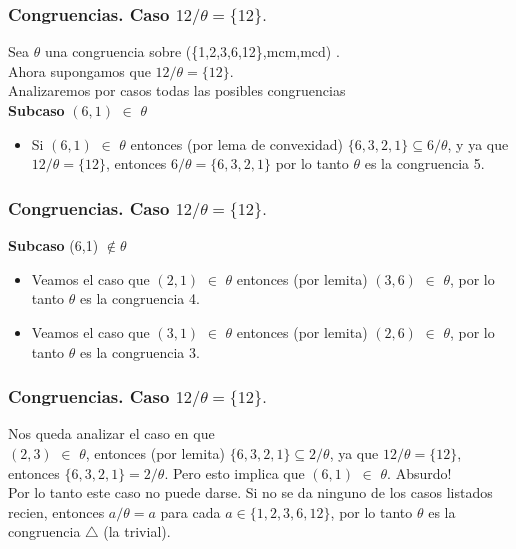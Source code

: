 \documentclass{beamer}
\begin{document}
\begin{frame}
\frametitle{Congruencias. Caso $12/\theta=\{12\}.$}
Sea $\theta$ una congruencia sobre (\{1,2,3,6,12\},mcm,mcd) .\\

\noindent Ahora supongamos que $12/\theta=\{12\}.$\\
Analizaremos por casos todas las posibles congruencias\\
\textbf{Subcaso }$(6,1)$ $\in$ $\theta$ \\
\begin{itemize}
	\item     Si $(6,1)$ $\in$ $\theta$ entonces (por lema de convexidad)
    $\{6,3,2,1\} \subseteq 6/\theta$, y ya que $12/\theta=\{12\}$, entonces $6/\theta = \{6,3,2,1\}$ por lo tanto $\theta$ es la congruencia 5.\\
\end{itemize}
\end{frame}

\begin{frame}
\frametitle{Congruencias. Caso $12/\theta=\{12\}.$}
\textbf{Subcaso} (6,1) $\not \in \theta$
\begin{itemize}
\item Veamos el caso que $(2,1)$ $\in$ $\theta$ entonces (por lemita) $(3,6)$ $\in$
    $\theta$, por lo tanto $\theta$ es la congruencia 4.\\

\item Veamos el caso que $(3,1)$ $\in$ $\theta$ entonces (por lemita) $(2,6)$ $\in$
    $\theta$, por lo tanto $\theta$ es la congruencia 3.\\  

\end{itemize}
    
\end{frame}

\begin{frame}
\frametitle{Congruencias. Caso $12/\theta=\{12\}.$}
Nos queda analizar el caso en que\\
    $(2,3)$ $\in$ $\theta$, entonces (por lemita) $\{6,3,2,1\} \subseteq
    2/\theta$, ya que $12/\theta=\{12\}$, entonces $\{6,3,2,1\} = 2/\theta$.
    Pero esto implica que $(6,1)$ $\in$ $\theta$. Absurdo!\\
    Por lo tanto este caso no puede darse.
    Si no se da ninguno de los casos listados recien, entonces $a/\theta={a}$ para cada $a \in
    \{1,2,3,6,12\}$, por lo tanto $\theta$ es la congruencia $\bigtriangleup$ (la trivial).\\


\end{frame}
\end{document}
